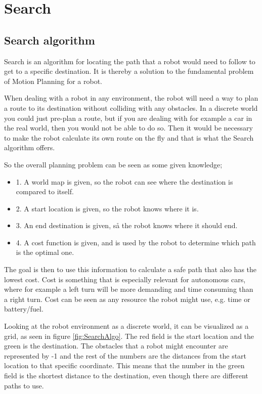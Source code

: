 \chapter{Search}
\label{chp:search}

\section{Search algorithm}

Search is an algorithm for locating the path that a robot would need to follow to get to a specific destination. It is thereby a solution to the fundamental problem of Motion Planning for a robot. 

When dealing with a robot in any environment, the robot will need a way to plan a route to its destination without colliding with any obstacles. In a discrete world you could just pre-plan a route, but if you are dealing with for example a car in the real world, then you would not be able to do so. Then it would be necessary to make the robot calculate its own route on the fly and that is what the Search algorithm offers.

So the overall planning problem can be seen as some given knowledge;
\begin{itemize}
	\item 1. A world map is given, so the robot can see where the destination is compared to itself.
	\item 2. A start location is given, so the robot knows where it is.
	\item 3. An end destination is given, så the robot knows where it should end.
	\item 4. A cost function is given, and is used by the robot to determine which path is the optimal one.
\end{itemize}

The goal is then to use this information to calculate a safe path that also has the lowest cost. Cost is something that is especially relevant for autonomous cars, where for example a left turn will be more demanding and time consuming than a right turn. Cost can be seen as any resource the robot might use, e.g. time or battery/fuel.

Looking at the robot environment as a discrete world, it can be visualized as a grid, as seen in figure \ref{fig:SearchAlgo}. The red field is the start location and the green is the destination. The obstacles that a robot might encounter are represented by -1 and the rest of the numbers are the distances from the start location to that specific coordinate. This means that the number in the green field is the shortest distance to the destination, even though there are different paths to use. 

